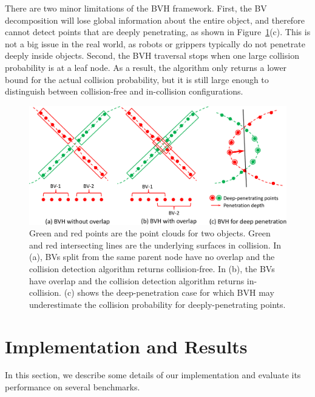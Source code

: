 There are two minor limitations of the BVH framework. First, the BV decomposition will lose global information about the entire object, and therefore cannot detect points that are deeply penetrating, as shown in Figure~\ref{fig:7:bvh_overlap}(c). This is not a big issue in the real world, as robots or grippers typically do not penetrate deeply inside objects. Second, the BVH traversal stops when one large collision probability is at a leaf node.
As a result, the algorithm only returns a lower bound for the actual collision probability, but it is still large enough to distinguish between collision-free and in-collision configurations.

\begin{figure}[htb]
  \centering
  \includegraphics[width=0.9\linewidth]{figs/7/bvh_overlap.pdf}
  \caption[BVH acceleration for point-cloud collision]{\label{fig:7:bvh_overlap} Green and red points are the point clouds for two objects. Green and red intersecting lines are the underlying surfaces in collision. In (a), BVs split from the same parent node
  have no overlap and the collision detection algorithm returns collision-free. In (b), the BVs have overlap and the collision detection algorithm returns in-collision. (c) shows the deep-penetration case for which BVH may underestimate the collision probability for deeply-penetrating points.}
\end{figure}


\section{Implementation and Results}
\label{sec:7:results}
In this section, we describe some details of our implementation and evaluate its performance on several benchmarks.

